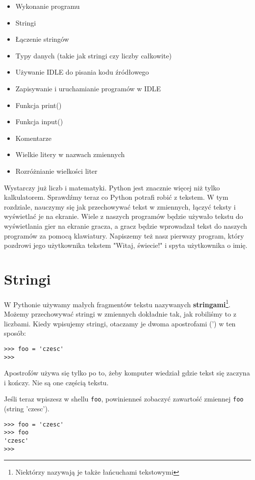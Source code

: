 \documentclass{book}
\newcommand{\btopicscovered}{
	\begin{graybox}
	\begin{itemize}
}
\newcommand{\etopicscovered}{
	\end{itemize}
	\end{graybox}
}
\begin{document}
\btopicscovered
	\item Wykonanie programu
	\item Stringi
	\item Łączenie stringów
	\item Typy danych (takie jak stringi czy liczby całkowite)
	\item Używanie IDLE do pisania kodu źródłowego
	\item Zapisywanie i uruchamianie programów w IDLE
	\item Funkcja print()
	\item Funkcja input()
	\item Komentarze
	\item Wielkie litery w nazwach zmiennych
	\item Rozróżnianie wielkości liter
\etopicscovered

Wystarczy już liczb i matematyki. Python jest znacznie więcej niż tylko kalkulatorem. Sprawdźmy teraz co Python potrafi robić z tekstem. W tym rozdziale, nauczymy się jak przechowywać tekst w zmiennych, łączyć teksty i wyświetlać je na ekranie. Wiele z naszych programów będzie używało tekstu do wyświetlania gier na ekranie gracza, a gracz będzie wprowadzał tekst do naszych programów za pomocą klawiatury. Napiszemy też nasz pierwszy program, który pozdrowi jego użytkownika tekstem "Witaj, świecie!" i spyta użytkownika o imię.

\section{Stringi}

W Pythonie używamy małych fragmentów tekstu nazywanych {\bf stringami}\footnote{Niektórzy nazywają je także łańcuchami tekstowymi}. Możemy przechowywać stringi w zmiennych dokładnie tak, jak robiliśmy to z liczbami. Kiedy wpisujemy stringi, otaczamy je dwoma apostrofami (') w ten sposób:

\begin{lstlisting}
>>> foo = 'czesc'
>>>
\end{lstlisting}

Apostrofów używa się tylko po to, żeby komputer wiedział gdzie tekst się zaczyna i kończy. Nie są one częścią tekstu.

Jeśli teraz wpiszesz w shellu \lstinline{foo}, powinienneś zobaczyć zawartość zmiennej \lstinline{foo} (string 'czesc'). 


\begin{lstlisting}
>>> foo = 'czesc'
>>> foo
'czesc'
>>>
\end{lstlisting}
\end{document}

